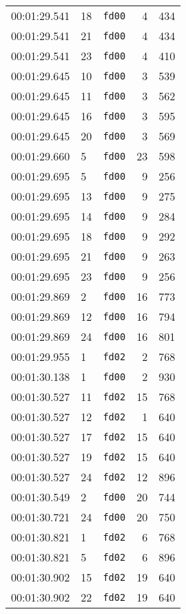 \documentclass{article}
\begin{document}
\begin{longtable}{lllrr}
00:01:29.541 & 18 & \texttt{fd00} & 4 & 434 \\
00:01:29.541 & 21 & \texttt{fd00} & 4 & 434 \\
00:01:29.541 & 23 & \texttt{fd00} & 4 & 410 \\
00:01:29.645 & 10 & \texttt{fd00} & 3 & 539 \\
00:01:29.645 & 11 & \texttt{fd00} & 3 & 562 \\
00:01:29.645 & 16 & \texttt{fd00} & 3 & 595 \\
00:01:29.645 & 20 & \texttt{fd00} & 3 & 569 \\
00:01:29.660 & 5 & \texttt{fd00} & 23 & 598 \\
00:01:29.695 & 5 & \texttt{fd00} & 9 & 256 \\
00:01:29.695 & 13 & \texttt{fd00} & 9 & 275 \\
00:01:29.695 & 14 & \texttt{fd00} & 9 & 284 \\
00:01:29.695 & 18 & \texttt{fd00} & 9 & 292 \\
00:01:29.695 & 21 & \texttt{fd00} & 9 & 263 \\
00:01:29.695 & 23 & \texttt{fd00} & 9 & 256 \\
00:01:29.869 & 2 & \texttt{fd00} & 16 & 773 \\
00:01:29.869 & 12 & \texttt{fd00} & 16 & 794 \\
00:01:29.869 & 24 & \texttt{fd00} & 16 & 801 \\
00:01:29.955 & 1 & \texttt{fd02} & 2 & 768 \\
00:01:30.138 & 1 & \texttt{fd00} & 2 & 930 \\
00:01:30.527 & 11 & \texttt{fd02} & 15 & 768 \\
00:01:30.527 & 12 & \texttt{fd02} & 1 & 640 \\
00:01:30.527 & 17 & \texttt{fd02} & 15 & 640 \\
00:01:30.527 & 19 & \texttt{fd02} & 15 & 640 \\
00:01:30.527 & 24 & \texttt{fd02} & 12 & 896 \\
00:01:30.549 & 2 & \texttt{fd00} & 20 & 744 \\
00:01:30.721 & 24 & \texttt{fd00} & 20 & 750 \\
00:01:30.821 & 1 & \texttt{fd02} & 6 & 768 \\
00:01:30.821 & 5 & \texttt{fd02} & 6 & 896 \\
00:01:30.902 & 15 & \texttt{fd02} & 19 & 640 \\
00:01:30.902 & 22 & \texttt{fd02} & 19 & 640 \\

\end{longtable}
\end{document}
